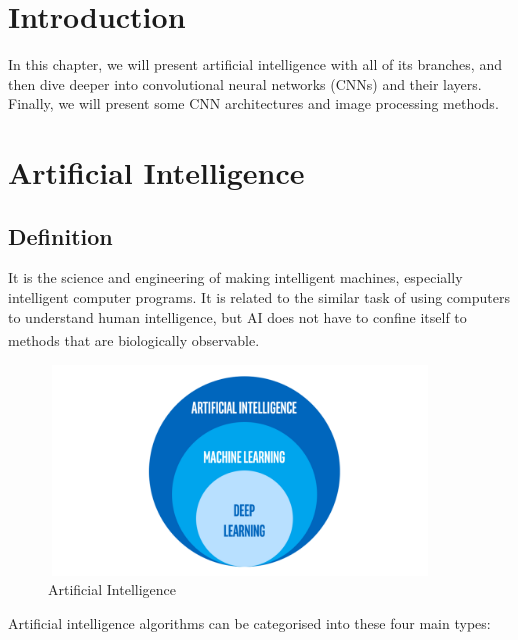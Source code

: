 \section{Introduction}
\vspace{0.2in}
\hspace*{0.16in}
In this chapter, we will present artificial intelligence with all of its branches, and then dive deeper into convolutional neural networks (CNNs) and their layers. Finally, we will present some CNN architectures and image processing methods.

\section{Artificial Intelligence}
\subsection{Definition}
It is the science and engineering of making intelligent machines, especially intelligent computer programs. It is related to the similar task of using computers to understand human intelligence, but AI does not have to confine itself to methods that are biologically observable. \textsuperscript{\cite{mccarthy2004artificial}}

\vspace{0.2in}

\begin{figure}[h]
\centering
  \vspace{-0.1in}
    \centerline{\includegraphics[width = 4in, height = 2.2in]{../images/artificial-intelligence.png}}
    \caption{Artificial Intelligence}
\end{figure}

Artificial intelligence algorithms can be categorised into these four main types:

